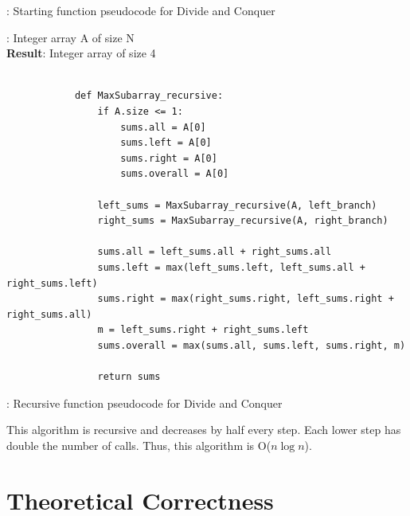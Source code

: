 \documentclass[a4paper,10pt]{article}
\begin{document}
			\begin{center}
			: Starting function pseudocode for Divide and Conquer
			\end{center}

			\vspace{1em}
			
			: Integer array A of size N \\
			{\bf Result}: Integer array of size 4

			\begin{minipage}[!h]{6in}
			\begin{verbatim}

			def MaxSubarray_recursive:
			    if A.size <= 1:
			        sums.all = A[0]
			        sums.left = A[0]
			        sums.right = A[0]
			        sums.overall = A[0]

			    left_sums = MaxSubarray_recursive(A, left_branch)
			    right_sums = MaxSubarray_recursive(A, right_branch)

			    sums.all = left_sums.all + right_sums.all
			    sums.left = max(left_sums.left, left_sums.all + right_sums.left)
			    sums.right = max(right_sums.right, left_sums.right + right_sums.all)
			    m = left_sums.right + right_sums.left
			    sums.overall = max(sums.all, sums.left, sums.right, m)

			    return sums
			\end{verbatim}
			\end{minipage}

			\begin{center}
			: Recursive function pseudocode for Divide and Conquer
			\end{center}

			\vspace{1em}

			\noindent This algorithm is recursive and decreases by half every step. Each lower step has double the number of calls. Thus, this algorithm is O($n \log n$).


	\section{Theoretical Correctness}
\end{document}
